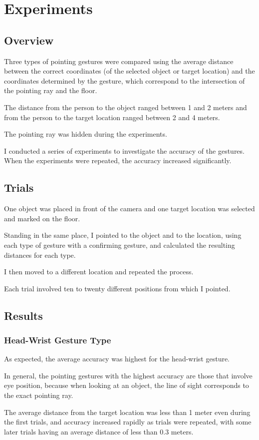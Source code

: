 \chapter{Experiments}

\section{Overview}
Three types of pointing gestures were compared using the average distance between the correct coordinates (of the selected object or target location) and the coordinates determined by the gesture, which correspond to the intersection of the pointing ray and the floor.\par
The distance from the person to the object ranged between 1 and 2 meters and from the person to the target location ranged between 2 and 4 meters.\par
The pointing ray was hidden during the experiments.\par
I conducted a series of experiments to investigate the accuracy of the gestures. When the experiments were repeated, the accuracy increased significantly.\par

\section{Trials}
One object was placed in front of the camera and one target location was selected and marked on the floor.\par
Standing in the same place, I pointed to the object and to the location, using each type of gesture with a confirming gesture, and calculated the resulting distances for each type.\par
I then moved to a different location and repeated the process.\par
Each trial involved ten to twenty different positions from which I pointed.\par

\section{Results}
\subsection{Head-Wrist Gesture Type}
As expected, the average accuracy was highest for the head-wrist gesture.\par
In general, the pointing gestures with the highest accuracy are those that involve eye position, because when looking at an object, the line of sight corresponds to the exact pointing ray.\par
The average distance from the target location was less than 1 meter even during the first trials, and accuracy increased rapidly as trials were repeated, with some later trials having an average distance of less than 0.3 meters.\par

